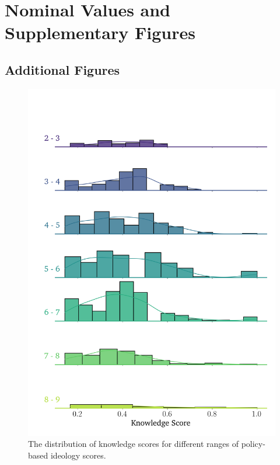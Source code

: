 \chapter{Nominal Values and Supplementary Figures}

\label{AppendixB}


\section{Additional Figures}
\begin{figure}
	\begin{center}
		\includegraphics[width=.8\textwidth]{Figures/knowledge_pbs_dist.png}
	\end{center}
	\caption{The distribution of knowledge scores for different ranges of policy-based ideology scores.}\label{fig:knowledge_pbs}
\end{figure}

